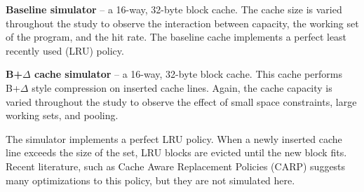 \documentclass[pageno]{jpaper}
\begin{document}
\textbf{Baseline simulator} -- a 16-way, 32-byte block cache. The cache size is varied throughout the study to observe the interaction between capacity, the working set of the program, and the hit rate. The baseline cache implements a perfect least recently used (LRU) policy.

\textbf{B+$\Delta$ cache simulator} -- a 16-way, 32-byte block cache. This cache performs B+$\Delta$ style compression on inserted cache lines. Again, the cache capacity is varied throughout the study to observe the effect of small space constraints, large working sets, and pooling.

The simulator implements a perfect LRU policy. When a newly inserted cache line exceeds the size of the set, LRU blocks are evicted until the new block fits. Recent literature, such as Cache Aware Replacement Policies\cite{carp} (CARP) suggests many optimizations to this policy, but they are not simulated here.




\end{document}
